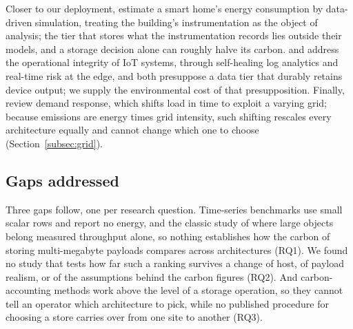 \documentclass[pdflatex,sn-basic]{sn-jnl}%
\begin{document}
{\color{markup}Closer to our deployment, \citet{adams_smart_home_energy} estimate a smart home's energy consumption by data-driven simulation, treating the building's instrumentation as the object of analysis; the tier that stores what the instrumentation records lies outside their models, and a storage decision alone can roughly halve its carbon.} {\color{markup}\citet{singh_iot_self_healing} and \citet{radanliev_iot_edge_risk} address the operational integrity of IoT systems, through self-healing log analytics and real-time risk at the edge, and both presuppose a data tier that durably retains device output; we supply the environmental cost of that presupposition.} {\color{markup}Finally, \citet{alessa_demand_response_review} review demand response, which shifts load in time to exploit a varying grid; because emissions are energy times grid intensity, such shifting rescales every architecture equally and cannot change which one to choose (Section~\ref{subsec:grid}).}

\subsection{{\color{markup}Gaps addressed}}\label{subsec:gaps}
{\color{markup}Three gaps follow, one per research question.} {\color{markup}Time-series benchmarks use small scalar rows and report no energy, and the classic study of where large objects belong measured throughput alone, so nothing establishes how the carbon of storing multi-megabyte payloads compares across architectures (RQ1).} {\color{markup}We found no study that tests how far such a ranking survives a change of host, of payload realism, or of the assumptions behind the carbon figures (RQ2).} {\color{markup}And carbon-accounting methods work above the level of a storage operation, so they cannot tell an operator which architecture to pick, while no published procedure for choosing a store carries over from one site to another (RQ3).}
\end{document}
